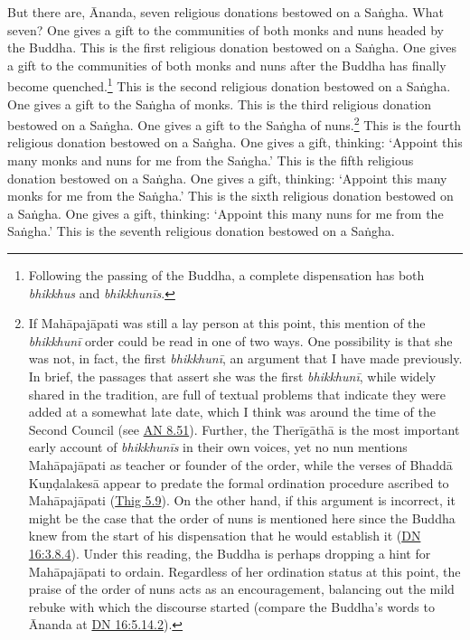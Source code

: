 \documentclass[12pt,openany]{book}%
\begin{document}
But there are, Ānanda, seven religious donations bestowed on a \textsanskrit{Saṅgha}. What seven? One gives a gift to the communities of both monks and nuns headed by the Buddha. This is the first religious donation bestowed on a \textsanskrit{Saṅgha}. One gives a gift to the communities of both monks and nuns after the Buddha has finally become quenched.\footnote{Following the passing of the Buddha, a complete dispensation has both \textit{bhikkhus} and \textit{\textsanskrit{bhikkhunīs}}. } This is the second religious donation bestowed on a \textsanskrit{Saṅgha}. One gives a gift to the \textsanskrit{Saṅgha} of monks. This is the third religious donation bestowed on a \textsanskrit{Saṅgha}. One gives a gift to the \textsanskrit{Saṅgha} of nuns.\footnote{If \textsanskrit{Mahāpajāpati} was still a lay person at this point, this mention of the \textit{\textsanskrit{bhikkhunī}} order could be read in one of two ways. One possibility is that she was not, in fact, the first \textit{\textsanskrit{bhikkhunī}}, an argument that I have made previously. In brief, the passages that assert she was the first \textit{\textsanskrit{bhikkhunī}}, while widely shared in the tradition, are full of textual problems that indicate they were added at a somewhat late date, which I think was around the time of the Second Council (see \href{https://suttacentral.net/an8.51/en/sujato}{AN 8.51}). Further,  the \textsanskrit{Therīgāthā} is the most important early account of \textit{\textsanskrit{bhikkhunīs}} in their own voices, yet no nun mentions \textsanskrit{Mahāpajāpati} as teacher or founder of the order, while the verses of \textsanskrit{Bhaddā} \textsanskrit{Kuṇḍalakesā} appear to predate the formal ordination procedure ascribed to \textsanskrit{Mahāpajāpati} (\href{https://suttacentral.net/thig5.9/en/sujato}{Thig 5.9}). On the other hand, if this argument is incorrect, it might be the case that the order of nuns is mentioned here since the Buddha knew from the start of his dispensation that he would establish it (\href{https://suttacentral.net/dn16/en/sujato\#3.8.4}{DN 16:3.8.4}). Under this reading, the Buddha is perhaps dropping a hint for \textsanskrit{Mahāpajāpati} to ordain. Regardless of her ordination status at this point, the praise of the order of nuns acts as an encouragement, balancing out the mild rebuke with which the discourse started (compare the Buddha’s words to Ānanda at \href{https://suttacentral.net/dn16/en/sujato\#5.14.2}{DN 16:5.14.2}). } This is the fourth religious donation bestowed on a \textsanskrit{Saṅgha}. One gives a gift, thinking: ‘Appoint this many monks and nuns for me from the \textsanskrit{Saṅgha}.’ This is the fifth religious donation bestowed on a \textsanskrit{Saṅgha}. One gives a gift, thinking: ‘Appoint this many monks for me from the \textsanskrit{Saṅgha}.’ This is the sixth religious donation bestowed on a \textsanskrit{Saṅgha}. One gives a gift, thinking: ‘Appoint this many nuns for me from the \textsanskrit{Saṅgha}.’ This is the seventh religious donation bestowed on a \textsanskrit{Saṅgha}. 
\end{document}
